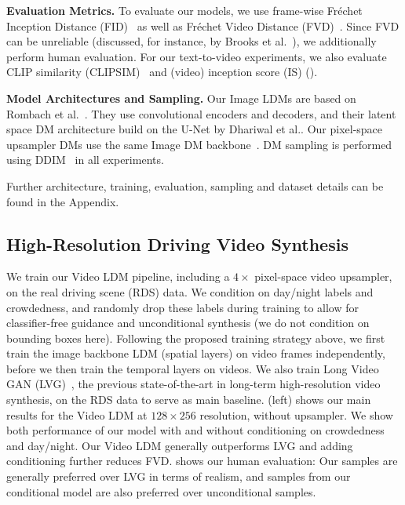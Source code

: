 \textbf{Evaluation Metrics.} To evaluate our models, we use frame-wise Fr\'echet Inception Distance (FID)~\cite{heusel2017gans} as well as Fr\'echet Video Distance (FVD)~\cite{unterthiner2018towards}. Since FVD can be unreliable (discussed, for instance, by Brooks et al.~\cite{brooks2022generating}), we additionally perform human evaluation. For our text-to-video experiments, we also evaluate CLIP similarity (CLIPSIM)~\cite{wu2021godiva} and (video) inception score (IS) ().

\textbf{Model Architectures and Sampling.} Our Image LDMs are based on Rombach et al.~\cite{rombach2021highresolution}. They use convolutional encoders and decoders, and their latent space DM architecture build on the U-Net by Dhariwal et al.\cite{dhariwal2021diffusion}. Our pixel-space upsampler DMs use the same Image DM backbone~\cite{dhariwal2021diffusion}. DM sampling is performed using DDIM~\cite{song2021denoising} in all experiments.

Further architecture, training, evaluation, sampling and dataset details can be found in the Appendix.

\subsection{High-Resolution Driving Video Synthesis} \label{sec:driving_exp}
We train our Video LDM pipeline, including a $4\times$ pixel-space video upsampler, on the real driving scene (RDS) data. We condition on day/night labels and crowdedness, and randomly drop these labels during training to allow for classifier-free guidance and unconditional synthesis (we do not condition on bounding boxes here). Following the proposed training strategy above, we first train the image backbone LDM (spatial layers) on video frames independently, before we then train the temporal layers on videos. We also train Long Video GAN (LVG)~\cite{brooks2022generating}, the previous state-of-the-art in long-term high-resolution video synthesis, on the RDS data to serve as main baseline.  (left) shows our main results for the Video LDM at $128\times256$ resolution, without upsampler. We show both performance of our model with and without conditioning on crowdedness and day/night. Our Video LDM generally outperforms LVG and adding conditioning further reduces FVD.  shows our human evaluation: Our samples are generally preferred over LVG in terms of realism, and samples from our conditional model are also preferred over unconditional samples.

